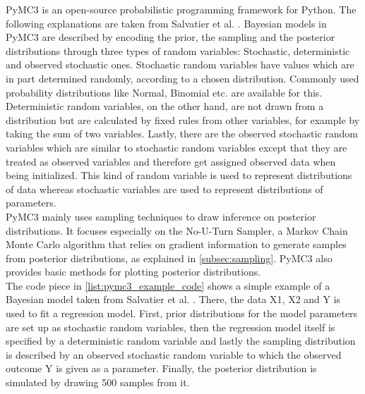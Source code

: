 \documentclass{article}
\begin{document}
PyMC3 is an open-source probabilistic programming framework for Python. The following explanations are taken from Salvatier et al. \cite{Salvatier2016}. Bayesian models in PyMC3 are described by encoding the prior, the sampling and the posterior distributions through three types of random variables: Stochastic, deterministic and observed stochastic ones. Stochastic random variables have values which are in part determined randomly, according to a chosen distribution. Commonly used probability distributions like Normal, Binomial etc. are available for this. Deterministic random variables, on the other hand, are not drawn from a distribution but are calculated by fixed rules from other variables, for example by taking the sum of two variables. Lastly, there are the observed stochastic random variables which are similar to stochastic random variables except that they are treated as observed variables and therefore get assigned observed data when being initialized. This kind of random variable is used to represent distributions of data whereas stochastic variables are used to represent distributions of parameters.
\\
PyMC3 mainly uses sampling techniques to draw inference on posterior distributions. It focuses especially on the No-U-Turn Sampler, a Markov Chain Monte Carlo algorithm that relies on gradient information to generate samples from posterior distributions, as explained in \autoref{subsec:sampling}. PyMC3 also provides basic methods for plotting posterior distributions.
\\
The code piece in \autoref{list:pymc3_example_code} shows a simple example of a Bayesian model taken from Salvatier et al. \cite{Salvatier2016}. There, the data X1, X2 and Y is used to fit a regression model. First, prior distributions for the model parameters are set up as stochastic random variables, then the regression model itself is specified by a deterministic random variable and lastly the sampling distribution is described by an observed stochastic random variable to which the observed outcome Y is given as a parameter. Finally, the posterior distribution is simulated by drawing 500 samples from it. \\
\end{document}
